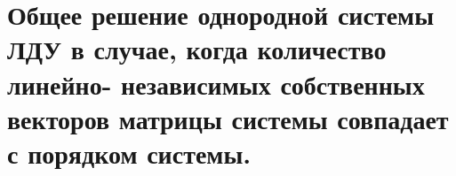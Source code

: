 {
	\section{Общее решение однородной системы ЛДУ в случае, когда количество линейно-
	независимых собственных векторов матрицы системы совпадает с порядком системы.}

	\newpage
}